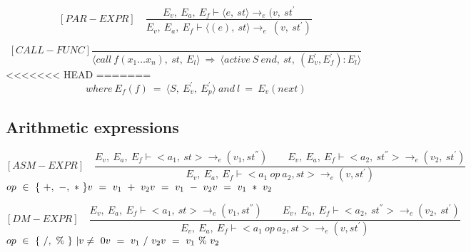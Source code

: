 	
	
	
	
	\[	
	[PAR-EXPR] \quad	
	\dfrac{E_v, \ E_a, \ E_f \vdash \langle e, \ st \rangle \rightarrow_e (v, \ st^{'}}{E_v, \ E_a, \ E_f \vdash \langle (e), \ st \rangle \rightarrow_e \ (v, \ st^{'})}	
	\]
	
	
	
	
	
	
	
	\[
	[CALL-FUNC]
	\dfrac{}{ \langle call \ f(x_1 … x_n), \ st, \ E_l \rangle \ \Rightarrow \ \langle active \ S \ end, \ st, \ (E_v^{‘}, E_f^{‘}) : E_l \rangle}
	\]
<<<<<<< HEAD
=======
	\begin{math}		
		\qquad \qquad \qquad \qquad where \ E_f(f) \ = \ \langle S, \ E_v^{'}, \ E_p^{'} \rangle \
		and \ l \ = \ E_v(next)
	\end{math}
   	
   	\subsection{Arithmetic expressions}
   	
   	\[
   	[ASM-EXPR] \quad
   	\dfrac{E_v, \ E_a, \ E_f \vdash <a_1, \ st> \rightarrow_{e} (v_1, st^{''}) \qquad E_v, \ E_a, \ E_f \vdash <a_2, \ st^{''}> \rightarrow_e (v_2, \ st^{'})}{E_v, \ E_a, \ E_f \vdash <a_1 \ op \ a_2, st> \rightarrow_{e} (v, st^{'})}
   	\]
 	\begin{math}
 	op \ \in \ \{ \ +, \ -, \ * \ \} \newline
   	v \ = \ v_1 \ + \ v_2 \newline
   	v \ = \ v_1 \ - \ v_2 \newline
   	v \ = \ v_1 \ * \ v_2
   	\end{math}
   	
   	\[
   	[DM-EXPR] \quad
   	\dfrac{E_v, \ E_a, \ E_f \vdash <a_1, \ st> \rightarrow_{e} (v_1, st^{''}) \qquad E_v, \ E_a, \ E_f \vdash <a_2, \ st^{''}> \rightarrow_e (v_2, \ st^{'})}{E_v, \ E_a, \ E_f \vdash <a_1 \ op \ a_2, st> \rightarrow_{e} (v, st^{'})}
   	\]
   	\begin{math}
   	op \ \in \ \{ \ /, \ \% \ \} \ | v \not= \ 0 \newline 
   	v \ = \ v_1 \ / \ v_2 \newline
   	v \ = \ v_1 \ \% \ v_2
   	\end{math}   	   	   	


